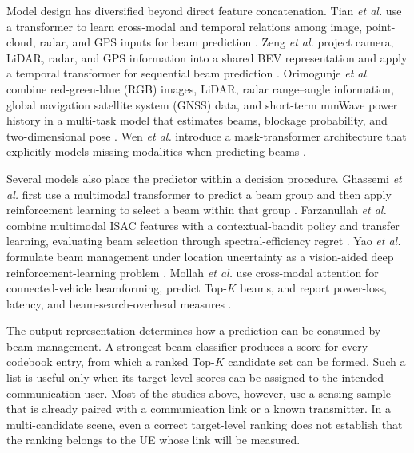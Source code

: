 Model design has diversified beyond direct feature concatenation.  Tian
\emph{et al.} use a transformer to learn cross-modal and temporal relations
among image, point-cloud, radar, and GPS inputs for beam prediction
\cite{tian2023multimodaltransformerswirelesscommunications}.  Zeng \emph{et al.}
project camera, LiDAR, radar, and GPS information into a shared BEV
representation and apply a temporal transformer for sequential beam prediction
\cite{zeng2026bevfusionbasedframeworksequential}.  Orimogunje \emph{et al.}
combine red-green-blue (RGB) images, LiDAR, radar range--angle information,
global navigation satellite system (GNSS) data, and short-term mmWave
power history in a multi-task model that estimates beams, blockage probability,
and two-dimensional pose \cite{orimogunje2026occlusionawaremultimodalbeamprediction}.
Wen \emph{et al.} introduce a mask-transformer architecture that explicitly
models missing modalities when predicting beams
\cite{wen2026amberadaptivemultimodalmask}.

Several models also place the predictor within a decision procedure.  Ghassemi
\emph{et al.} first use a multimodal transformer to predict a beam group and
then apply reinforcement learning to select a beam within that group
\cite{ghassemi2024multimodaltransformerreinforcementlearningbased}.  Farzanullah
\emph{et al.} combine multimodal ISAC features with a contextual-bandit policy
and transfer learning, evaluating beam selection through spectral-efficiency
regret \cite{farzanullah2025beamselectionisacusing}.  Yao \emph{et al.} formulate
beam management under location uncertainty as a vision-aided deep
reinforcement-learning problem \cite{yao2022jointsensingcommunicationsdeep}.
Mollah \emph{et al.} use cross-modal attention for connected-vehicle
beamforming, predict Top-$K$ beams, and report power-loss, latency, and
beam-search-overhead measures \cite{mollah2026multimodalsensingfusionmmwave}.

The output representation determines how a prediction can be consumed by beam
management.  A strongest-beam classifier produces a score for every codebook
entry, from which a ranked Top-$K$ candidate set can be formed.  Such a list is
useful only when its target-level scores can be assigned to the intended
communication user.  Most of the studies above, however, use a sensing sample
that is already paired with a communication link or a known transmitter.  In a
multi-candidate scene, even a correct target-level ranking does not establish
that the ranking belongs to the UE whose link will be measured.

